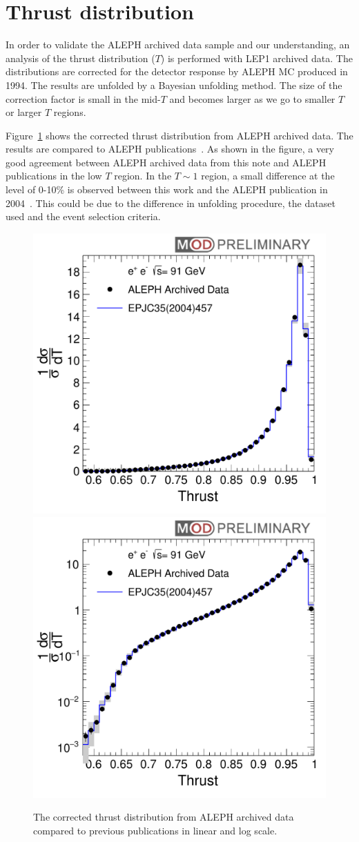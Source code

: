 \section{Thrust distribution}

In order to validate the ALEPH archived data sample and our understanding,
an analysis of the thrust distribution ($T$) is performed with LEP1 archived
data. The distributions are corrected for the detector response by ALEPH MC
produced in 1994. The results are unfolded by a Bayesian unfolding method. The size of the correction factor is small in the mid-$T$
and becomes larger as we go to smaller $T$ or larger $T$ regions.


Figure~\ref{fig:ThrustResults} shows the corrected thrust distribution from ALEPH archived data. The results are compared to ALEPH
publications~\cite{Barate:1996fi,heister:2003aj}. As shown in the figure, a very good agreement between ALEPH archived data from this note
and ALEPH publications in the low $T$ region. In the $T\sim 1$ region, a small difference at the level of 0-10\% is observed between this work
and the ALEPH publication in 2004~\cite{heister:2003aj}. This could be due to the difference in unfolding procedure, the dataset used and the event selection criteria.


\begin{figure}[H]
\centering
\includegraphics[width=.49\textwidth]{images/Thrust/ThrustResult.pdf}
\includegraphics[width=.49\textwidth]{images/Thrust/ThrustResultLogY.pdf}
\caption{The corrected thrust distribution from ALEPH archived data compared to previous publications in linear and log scale.}
\label{fig:ThrustResults}
\end{figure}
